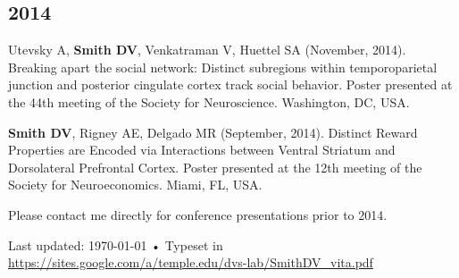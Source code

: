 \documentclass[11pt, letterpaper]{article}
\begin{document}
\subsection*{2014}
\begin{hangparas}{.5in}{1}
Utevsky A, \textbf{Smith DV}, Venkatraman V, Huettel SA (November, 2014). Breaking apart the social network: Distinct subregions within temporoparietal junction and posterior cingulate cortex track social behavior. Poster presented at the 44th meeting of the Society for Neuroscience. Washington, DC, USA.

\textbf{Smith DV}, Rigney AE, Delgado MR (September, 2014). Distinct Reward Properties are Encoded via Interactions between Ventral Striatum and Dorsolateral Prefrontal Cortex. Poster presented at the 12th meeting of the Society for Neuroeconomics. Miami, FL, USA. \\

\end{hangparas}

\vspace{.5cm}
Please contact me directly for conference presentations prior to 2014. 




\vfill{}

\begin{center}
{\scriptsize  Last updated: \today\- •\-
Typeset in \href{http://nitens.org/taraborelli/cvtex}{\XeTeX }\\
\href{https://sites.google.com/a/temple.edu/dvs-lab/SmithDV\_vita.pdf}{https://sites.google.com/a/temple.edu/dvs-lab/SmithDV\_vita.pdf}}
\end{center}
\end{document}
